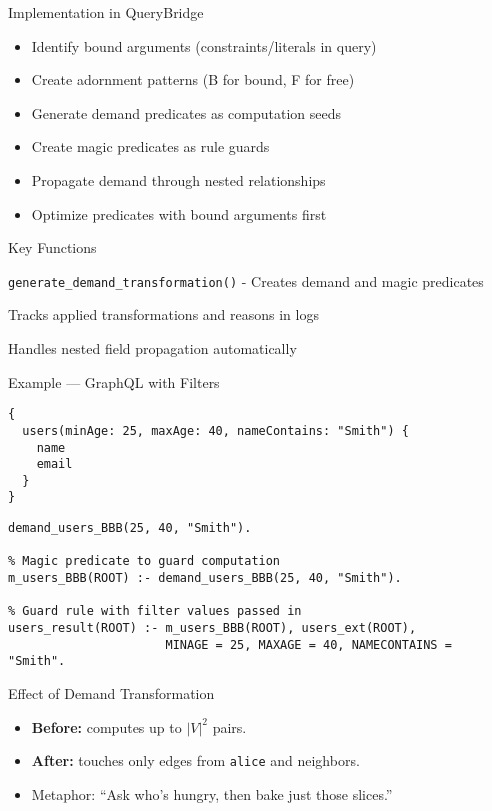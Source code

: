 \documentclass{beamer}
\begin{document}
\begin{frame}{Implementation in QueryBridge}
  \begin{itemize}
    \item Identify bound arguments (constraints/literals in query)
    \item Create adornment patterns (B for bound, F for free)
    \item Generate demand predicates as computation seeds
    \item Create magic predicates as rule guards
    \item Propagate demand through nested relationships
    \item Optimize predicates with bound arguments first
  \end{itemize}
  
  \begin{block}{Key Functions}
    \item \texttt{generate\_demand\_transformation()} - Creates demand and magic predicates
    \item Tracks applied transformations and reasons in logs
    \item Handles nested field propagation automatically
  \end{block}
\end{frame}

\begin{frame}[fragile]{Example — GraphQL with Filters}
\begin{lstlisting}
{
  users(minAge: 25, maxAge: 40, nameContains: "Smith") {
    name
    email
  }
}
\end{lstlisting}

\begin{lstlisting}[basicstyle=\scriptsize\ttfamily]
% Seed demand with filter values
demand_users_BBB(25, 40, "Smith").

% Magic predicate to guard computation
m_users_BBB(ROOT) :- demand_users_BBB(25, 40, "Smith").

% Guard rule with filter values passed in
users_result(ROOT) :- m_users_BBB(ROOT), users_ext(ROOT), 
                      MINAGE = 25, MAXAGE = 40, NAMECONTAINS = "Smith".
\end{lstlisting}
\end{frame}

\begin{frame}{Effect of Demand Transformation}
  \begin{itemize}
    \item \textbf{Before:} computes up to $|V|^2$ pairs.
    \item \textbf{After:} touches only edges from \texttt{alice} and neighbors.
    \item Metaphor: “Ask who’s hungry, then bake just those slices.”
  \end{itemize}
\end{frame}
\end{document}

